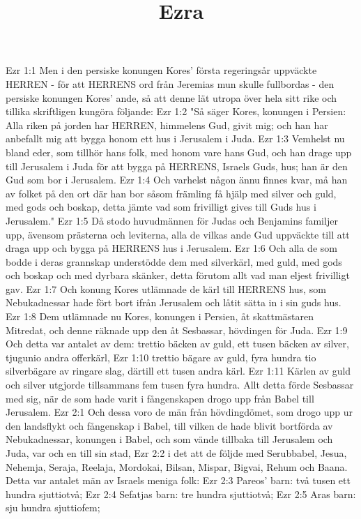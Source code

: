 

\title{Ezra}

Ezr 1:1  Men i den persiske konungen Kores' första regeringsår uppväckte HERREN - för att HERRENS ord från Jeremias mun skulle fullbordas - den persiske konungen Kores' ande, så att denne lät utropa över hela sitt rike och tillika skriftligen kungöra följande:
Ezr 1:2  "Så säger Kores, konungen i Persien: Alla riken på jorden har HERREN, himmelens Gud, givit mig; och han har anbefallt mig att bygga honom ett hus i Jerusalem i Juda.
Ezr 1:3  Vemhelst nu bland eder, som tillhör hans folk, med honom vare hans Gud, och han drage upp till Jerusalem i Juda för att bygga på HERRENS, Israels Guds, hus; han är den Gud som bor i Jerusalem.
Ezr 1:4  Och varhelst någon ännu finnes kvar, må han av folket på den ort där han bor såsom främling få hjälp med silver och guld, med gods och boskap, detta jämte vad som frivilligt gives till Guds hus i Jerusalem."
Ezr 1:5  Då stodo huvudmännen för Judas och Benjamins familjer upp, ävensom prästerna och leviterna, alla de vilkas ande Gud uppväckte till att draga upp och bygga på HERRENS hus i Jerusalem.
Ezr 1:6  Och alla de som bodde i deras grannskap understödde dem med silverkärl, med guld, med gods och boskap och med dyrbara skänker, detta förutom allt vad man eljest frivilligt gav.
Ezr 1:7  Och konung Kores utlämnade de kärl till HERRENS hus, som Nebukadnessar hade fört bort ifrån Jerusalem och låtit sätta in i sin guds hus.
Ezr 1:8  Dem utlämnade nu Kores, konungen i Persien, åt skattmästaren Mitredat, och denne räknade upp den åt Sesbassar, hövdingen för Juda.
Ezr 1:9  Och detta var antalet av dem: trettio bäcken av guld, ett tusen bäcken av silver, tjugunio andra offerkärl,
Ezr 1:10  trettio bägare av guld, fyra hundra tio silverbägare av ringare slag, därtill ett tusen andra kärl.
Ezr 1:11  Kärlen av guld och silver utgjorde tillsammans fem tusen fyra hundra. Allt detta förde Sesbassar med sig, när de som hade varit i fångenskapen drogo upp från Babel till Jerusalem.
Ezr 2:1  Och dessa voro de män från hövdingdömet, som drogo upp ur den landsflykt och fångenskap i Babel, till vilken de hade blivit bortförda av Nebukadnessar, konungen i Babel, och som vände tillbaka till Jerusalem och Juda, var och en till sin stad,
Ezr 2:2  i det att de följde med Serubbabel, Jesua, Nehemja, Seraja, Reelaja, Mordokai, Bilsan, Mispar, Bigvai, Rehum och Baana. Detta var antalet män av Israels meniga folk:
Ezr 2:3  Pareos' barn: två tusen ett hundra sjuttiotvå;
Ezr 2:4  Sefatjas barn: tre hundra sjuttiotvå;
Ezr 2:5  Aras barn: sju hundra sjuttiofem;
